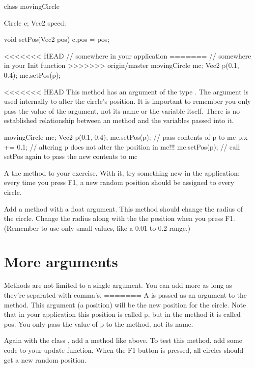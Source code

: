 \begin{code}
class movingCircle {
  Circle c;
  Vec2 speed;
  
  void setPos(Vec2 pos) {
    c.pos = pos;
  }
}

<<<<<<< HEAD
// somewhere in your application
=======
// somewhere in your Init function
>>>>>>> origin/master
movingCircle mc;
Vec2 p(0.1, 0.4);
mc.setPos(p);
\end{code}

<<<<<<< HEAD
This method has an argument of the type . The argument is used internally to alter the circle's position. It is important to remember you only pass the value of the argument, not its name or the variable itself. There is no established relationship between an method and the variables passed into it. 

\begin{code}
movingCircle mc;
Vec2 p(0.1, 0.4);
mc.setPos(p);     // pass contents of p to mc
p.x += 0.1;       // altering p does not alter the position in mc!!!
mc.setPos(p);     // call setPos again to pass the new contents to mc
\end{code}

\begin{exercise}
A the method  to your exercise. With it, try something new in the application: every time you press F1, a new random position should be assigned to every circle.

Add a method  with a float argument. This method should change the radius of the circle. Change the radius along with the the position when you press F1. (Remember to use only small values, like a 0.01 to 0.2 range.)
\end{exercise}

\section{More arguments}
Methods are not limited to a single argument. You can add more as long as they're separated with comma's.
=======
A  is passed as an argument to the method. This argument (a position) will be the new position for the circle. Note that in your application this position is called p, but in the method it is called pos. You only pass the value of p to the method, not its name.

\begin{exercise}
Again with the class , add a method  like above. To test this method, add some code to your update function. When the F1 button is pressed, all circles should get a new random position.
\end{exercise}

